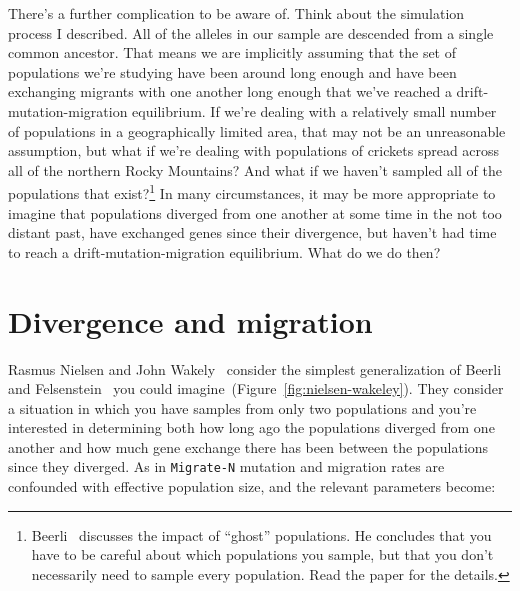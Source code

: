 \documentclass[12pt]{article}
\begin{document}
There's a further complication to be aware of. Think about the
simulation process I described. All of the alleles in our sample are
descended from a single common ancestor. That means we are implicitly
assuming that the set of populations we're studying have been around
long enough and have been exchanging migrants with one another long
enough that we've reached a drift-mutation-migration equilibrium. If
we're dealing with a relatively small number of populations in a
geographically limited area, that may not be an unreasonable
assumption, but what if we're dealing with populations of crickets
spread across all of the northern Rocky Mountains? And what if we
haven't sampled all of the populations that
exist?\footnote{Beerli~\cite{Beerli-2004} discusses the impact of
  ``ghost'' populations. He concludes that you have to be careful
  about which populations you sample, but that you don't necessarily
  need to sample every population. Read the paper for the details.} In
many circumstances, it may be more appropriate to imagine that
populations diverged from one another at some time in the not too
distant past, have exchanged genes since their divergence, but haven't
had time to reach a drift-mutation-migration equilibrium. What do we
do then?

\section*{Divergence and migration}

Rasmus Nielsen and John Wakely~\cite{Nielsen-Wakeley-2001} consider
the simplest generalization of Beerli and
Felsenstein~\cite{Beerli-Felsenstein-1999,Beerli-Felsenstein-2001} you
could imagine~(Figure~\ref{fig:nielsen-wakeley}). They consider a
situation in which you have samples from only two populations and
you're interested in determining both how long ago the populations
diverged from one another and how much gene exchange there has been
between the populations since they diverged. As in {\tt Migrate-N}
mutation and migration rates are confounded with effective population
size, and the relevant parameters become:
\end{document}
